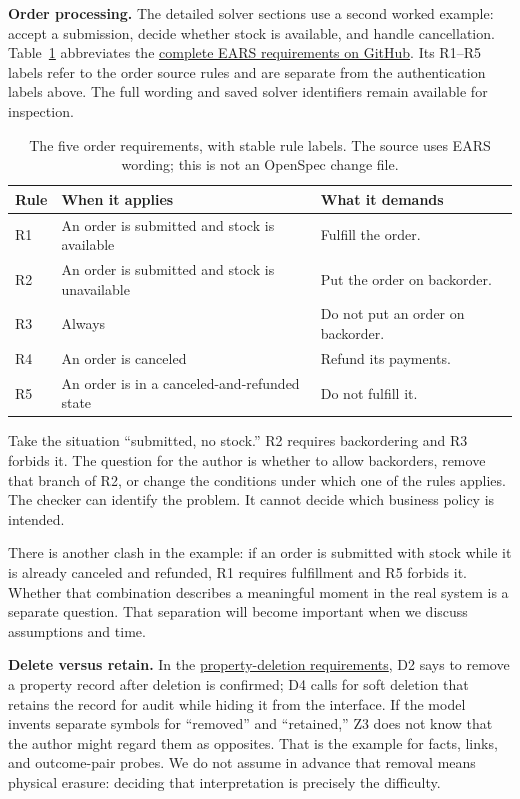 \textbf{Order processing.} The detailed solver sections use a second worked example: accept a submission, decide whether stock is available, and handle cancellation. Table~\ref{tab:order} abbreviates the \href{\orderurl}{complete EARS requirements on GitHub}. Its R1--R5 labels refer to the order source rules and are separate from the authentication labels above. The full wording and saved solver identifiers remain available for inspection.

\begin{table}[H]
\centering
\begin{tabularx}{\linewidth}{@{}lXX@{}}
\toprule
Rule & When it applies & What it demands \\
\midrule
R1 & An order is submitted and stock is available & Fulfill the order. \\
R2 & An order is submitted and stock is unavailable & Put the order on backorder. \\
R3 & Always & Do not put an order on backorder. \\
R4 & An order is canceled & Refund its payments. \\
R5 & An order is in a canceled-and-refunded state & Do not fulfill it. \\
\bottomrule
\end{tabularx}
\caption{The five order requirements, with stable rule labels. The source uses EARS wording; this is not an OpenSpec change file.}\label{tab:order}
\end{table}

Take the situation ``submitted, no stock.'' R2 requires backordering and R3 forbids it. The question for the author is whether to allow backorders, remove that branch of R2, or change the conditions under which one of the rules applies. The checker can identify the problem. It cannot decide which business policy is intended.

There is another clash in the example: if an order is submitted with stock while it is already canceled and refunded, R1 requires fulfillment and R5 forbids it. Whether that combination describes a meaningful moment in the real system is a separate question. That separation will become important when we discuss assumptions and time.

\textbf{Delete versus retain.} In the \href{\deletionurl}{property-deletion requirements}, D2 says to remove a property record after deletion is confirmed; D4 calls for soft deletion that retains the record for audit while hiding it from the interface. If the model invents separate symbols for ``removed'' and ``retained,'' Z3 does not know that the author might regard them as opposites. That is the example for facts, links, and outcome-pair probes. We do not assume in advance that removal means physical erasure: deciding that interpretation is precisely the difficulty.

